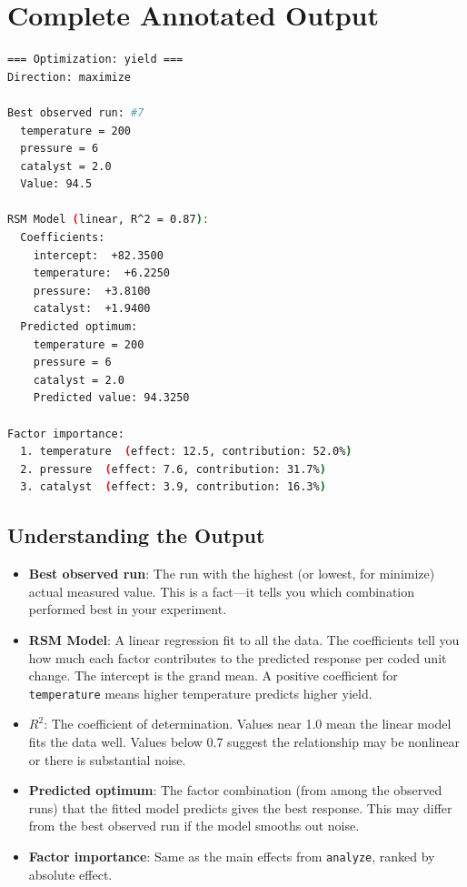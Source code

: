 \documentclass[11pt]{book}
\begin{document}
\section{Complete Annotated Output}

\begin{lstlisting}[language=bash]
=== Optimization: yield ===
Direction: maximize

Best observed run: #7
  temperature = 200
  pressure = 6
  catalyst = 2.0
  Value: 94.5

RSM Model (linear, R^2 = 0.87):
  Coefficients:
    intercept:  +82.3500
    temperature:  +6.2250
    pressure:  +3.8100
    catalyst:  +1.9400
  Predicted optimum:
    temperature = 200
    pressure = 6
    catalyst = 2.0
    Predicted value: 94.3250

Factor importance:
  1. temperature  (effect: 12.5, contribution: 52.0%)
  2. pressure  (effect: 7.6, contribution: 31.7%)
  3. catalyst  (effect: 3.9, contribution: 16.3%)
\end{lstlisting}

\subsection{Understanding the Output}

\begin{itemize}
  \item \textbf{Best observed run}: The run with the highest (or lowest, for minimize) actual measured value. This is a fact---it tells you which combination performed best in your experiment.
  \item \textbf{RSM Model}: A linear regression fit to all the data. The coefficients tell you how much each factor contributes to the predicted response per coded unit change. The intercept is the grand mean. A positive coefficient for \texttt{temperature} means higher temperature predicts higher yield.
  \item \textbf{$R^2$}: The coefficient of determination. Values near 1.0 mean the linear model fits the data well. Values below 0.7 suggest the relationship may be nonlinear or there is substantial noise.
  \item \textbf{Predicted optimum}: The factor combination (from among the observed runs) that the fitted model predicts gives the best response. This may differ from the best observed run if the model smooths out noise.
  \item \textbf{Factor importance}: Same as the main effects from \texttt{analyze}, ranked by absolute effect.
\end{itemize}
\end{document}
